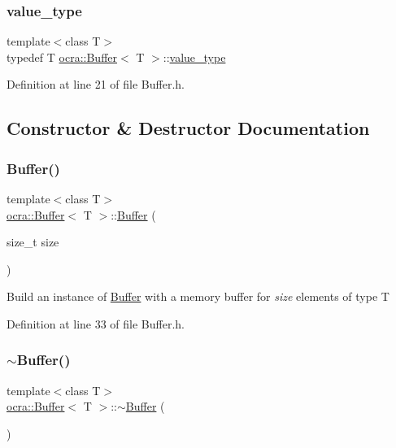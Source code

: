 \subsubsection{\texorpdfstring{value\+\_\+type}{value\_type}}
{\footnotesize\ttfamily template$<$class T$>$ \\
typedef T \hyperlink{classocra_1_1Buffer}{ocra\+::\+Buffer}$<$ T $>$\+::\hyperlink{classocra_1_1Buffer_ad03bef3764c265411b5b7726d94d8786}{value\+\_\+type}}



Definition at line 21 of file Buffer.\+h.



\subsection{Constructor \& Destructor Documentation}
\hypertarget{classocra_1_1Buffer_a13b091b3f15fbdaadd00d87b89f0acd7}{}\label{classocra_1_1Buffer_a13b091b3f15fbdaadd00d87b89f0acd7} 
\subsubsection{\texorpdfstring{Buffer()}{Buffer()}}
{\footnotesize\ttfamily template$<$class T$>$ \\
\hyperlink{classocra_1_1Buffer}{ocra\+::\+Buffer}$<$ T $>$\+::\hyperlink{classocra_1_1Buffer}{Buffer} (\begin{DoxyParamCaption}\item[{size\+\_\+t}]{size }\end{DoxyParamCaption})\hspace{0.3cm}{\ttfamily [inline]}}

Build an instance of \hyperlink{classocra_1_1Buffer}{Buffer} with a memory buffer for {\itshape size} elements of type T 

Definition at line 33 of file Buffer.\+h.

\hypertarget{classocra_1_1Buffer_ac7050b30073f9fbfbf580c1b57a34781}{}\label{classocra_1_1Buffer_ac7050b30073f9fbfbf580c1b57a34781} 
\subsubsection{\texorpdfstring{$\sim$\+Buffer()}{~Buffer()}}
{\footnotesize\ttfamily template$<$class T$>$ \\
\hyperlink{classocra_1_1Buffer}{ocra\+::\+Buffer}$<$ T $>$\+::$\sim$\hyperlink{classocra_1_1Buffer}{Buffer} (\begin{DoxyParamCaption}{ }\end{DoxyParamCaption})\hspace{0.3cm}{\ttfamily [inline]}}



